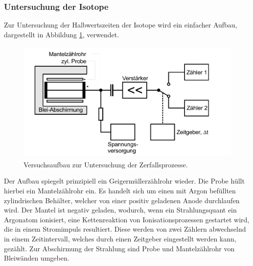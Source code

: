 \subsubsection{Untersuchung der Isotope}
Zur Untersuchung der Halbwertszeiten der Isotope wird ein einfacher Aufbau, dargestellt in Abbildung \ref{abb:2}, verwendet.
\begin{figure}[H]
  \centering
  \includegraphics[height=6cm]{ressources/aufbau.png}
  \caption{Versuchsaufbau zur Untersuchung der Zerfallsprozesse. \cite{skript}}
  \label{abb:2}
\end{figure}
Der Aufbau spiegelt prinzipiell ein Geigermüllerzählrohr wieder.
Die Probe hüllt hierbei ein Mantelzählrohr ein.
Es handelt sich um einen mit Argon befüllten zylindrischen Behälter, welcher von einer positiv geladenen Anode durchlaufen wird.
Der Mantel ist negativ geladen, wodurch, wenn ein Strahlungsquant ein Argonatom ionisiert, eine Kettenreaktion von Ionisationsprozessen gestartet wird, die in einem Stromimpuls resultiert.
Diese werden von zwei Zählern abwechselnd in einem Zeitintervall, welches durch einen Zeitgeber eingestellt werden kann, gezählt.
Zur Abschirmung der Strahlung sind Probe und Mantelzählrohr von Bleiwänden umgeben.
